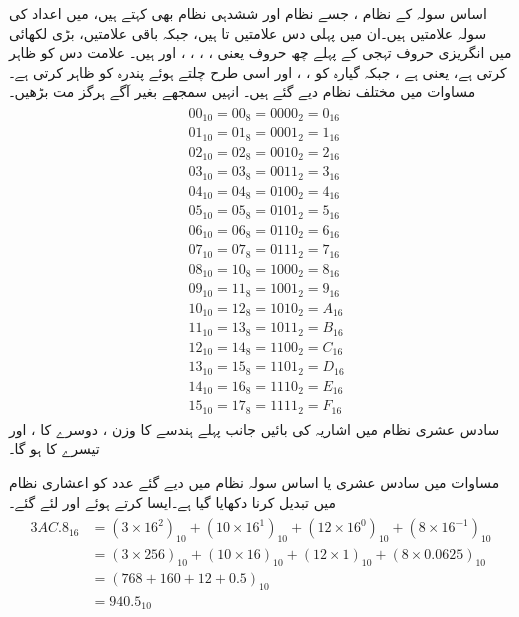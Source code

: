 	اساس سولہ کے نظام  ، جسے نظام اور ششدہی نظام بھی کہتے ہیں، میں اعداد کی سولہ علامتیں ہیں۔ان میں پہلی دس علامتیں  تا  ہیں، جبکہ باقی علامتیں، بڑی لکھائی میں انگریزی حروف تہجی کے پہلے چھ  حروف یعنی ، ، ، ،  اور  ہیں۔ علامت  دس  کو ظاہر کرتی ہے، یعنی  ہے ، جبکہ  گیارہ کو ، ، اور اسی طرح چلتے ہوئے  پندرہ کو ظاہر کرتی ہے۔مساوات  میں مختلف نظام دیے گئے ہیں۔ انہیں سمجھے بغیر آگے ہرگز مت بڑھیں۔ 
\begin{gather}
\begin{aligned}\label{مساوات_ثنائی_تمام}
&00_{10}=00_8=0000_2=0_{16}\\
&01_{10}=01_8=0001_2=1_{16}\\
&02_{10}=02_8=0010_2=2_{16}\\
&03_{10}=03_8=0011_2=3_{16}\\
&04_{10}=04_8=0100_2=4_{16}\\
&05_{10}=05_8=0101_2=5_{16}\\
&06_{10}=06_8=0110_2=6_{16}\\
&07_{10}=07_8=0111_2=7_{16}\\
&08_{10}=10_8=1000_2=8_{16}\\
&09_{10}=11_8=1001_2=9_{16}\\
&10_{10}=12_8=1010_2=A_{16}\\
&11_{10}=13_8=1011_2=B_{16}\\
&12_{10}=14_8=1100_2=C_{16}\\
&13_{10}=15_8=1101_2=D_{16}\\
&14_{10}=16_8=1110_2=E_{16}\\
&15_{10}=17_8=1111_2=F_{16}
\end{aligned}
\end{gather}
سادس عشری  نظام میں اشاریہ کی بائیں جانب پہلے ہندسے کا وزن ، دوسرے کا ، اور تیسرے کا  ہو گا۔ 

مساوات  میں سادس عشری یا اساس سولہ نظام میں دیے گئے عدد کو اعشاری نظام میں تبدیل کرنا دکھایا گیا ہے۔ایسا کرتے ہوئے  اور  لئے گئے۔
\begin{gather}
\begin{aligned}\label{مساوات_ثنائی_سادس}
3AC.8_{16}&=(3\times 16^2)_{10}+(10\times 16^1)_{10}+(12\times 16^0)_{10}+(8\times 16^{-1})_{10}\\
&=(3\times 256)_{10}+(10\times 16)_{10}+(12\times 1)_{10}+(8\times 0.0625)_{10}\\
&=(768+160+12+0.5)_{10}\\
&=940.5_{10}
\end{aligned}
\end{gather}

